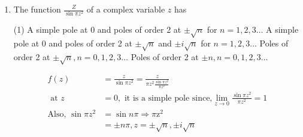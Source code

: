 \begin{enumerate}[label=\color{ocre}\textbf{\arabic*.}]
	\begin{answer}
		\begin{align*}
		\int_{-\infty}^{\infty} \frac{d z}{1+z^{4}} \quad \because|z|=R\\
		\text{Now, pole }z&=e^{(2 n+1) \frac{\pi}{4}}\\
		n&=0, \quad \Rightarrow z_{0}=e^{\frac{i \pi}{4}}=\frac{1}{\sqrt{2}}+i \frac{1}{\sqrt{2}}, n\\&=2 \Rightarrow z_{2}=\frac{-1}{\sqrt{2}}-i \frac{1}{\sqrt{2}}\\
		n&=1 \Rightarrow z_{1}=e^{\frac{i 3 \pi}{4}}=\frac{-1}{\sqrt{2}}+i \frac{1}{\sqrt{2}}, n\\&=3 \Rightarrow z_{3}=+\frac{1}{\sqrt{2}}-i \frac{1}{\sqrt{2}}
		\intertext{only $z_{0}$ and $z_{1}$ lies in contour}
		\text{i.e., residue at }\left(z=e^{\frac{i \pi}{4}}\right)&=\frac{1}{4}\left(-\frac{1}{\sqrt{2}}-i \frac{1}{\sqrt{2}}\right)\\
		\text{residue at }\left(z=e^{\frac{i 3 \pi}{4}}\right)&=\frac{1}{4}\left(\frac{1}{\sqrt{2}}-i \frac{1}{\sqrt{2}}\right)\\
		\text{now }\int_{-\infty}^{\infty} \frac{d x}{x^{4}+1}&=2 \pi i \Sigma \operatorname{Re} S=\frac{\pi}{\sqrt{2}}
		\end{align*}
		So the correct answer is \textbf{Option (A)}
	\end{answer}
	\item  The function $\frac{Z}{\sin \pi z^{2}}$ of a complex variable $z$ has
	{}
	\begin{tasks}(1)
		\task[\textbf{A.}] A simple pole at 0 and poles of order 2 at $\pm \sqrt{n}$ for $n=1,2,3 \ldots$
		\task[\textbf{B.}] A simple pole at 0 and poles of order 2 at $\pm \sqrt{n}$ and $\pm i \sqrt{n}$ for $n=1,2,3 \ldots$
		\task[\textbf{C.}] Poles of order 2 at $\pm \sqrt{n}, n=0,1,2,3 \ldots$
		\task[\textbf{D.}] Poles of order 2 at $\pm n, n=0,1,2,3 \ldots$
	\end{tasks}
	\begin{answer}
		\begin{align*}
		f(z)&=\frac{z}{\sin \pi z^{2}}=\frac{z}{\pi z^{2} \frac{\sin \pi z^{2}}{\pi z^{2}}}\\
		\text{	at }z&=0,\text{ it is a simple pole since,} \lim _{z \rightarrow 0} \frac{\sin \pi z^{2}}{\pi z^{2}}=1\\
		\text{Also, }\sin \pi z^{2}&=\sin n \pi \Rightarrow \pi \mathrm{z}^{2}\\&=\pm n \pi, z=\pm \sqrt{n}, \pm i \sqrt{n}\\

\end{align*}
\end{answer}
\end{enumerate}
